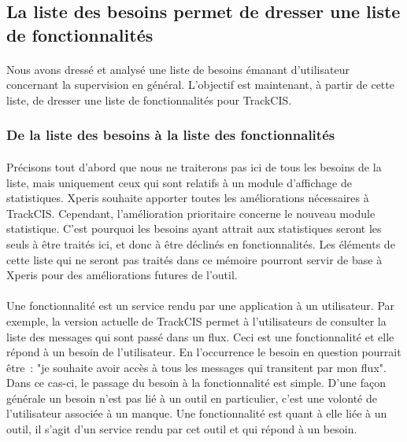 	\subsection{La liste des besoins permet de dresser une liste de fonctionnalités}
		\paragraph{}%
		Nous avons dressé et analysé une liste de besoins émanant d'utilisateur
		concernant la supervision en général. L'objectif est maintenant, à partir de
		cette liste, de dresser une liste de fonctionnalités pour TrackCIS.
		
		\subsubsection{De la liste des besoins à la liste des fonctionnalités}
			\paragraph{}%
			Précisons tout d'abord que nous ne traiterons pas ici de tous les besoins de la
			liste, mais uniquement ceux qui sont relatifs à un module d'affichage de
			statistiques. Xperis souhaite apporter toutes les améliorations nécessaires à
			TrackCIS. Cependant, l'amélioration prioritaire concerne le nouveau module
			statistique. C'est pourquoi les besoins ayant attrait aux statistiques seront
			les seuls à être traités ici, et donc à être déclinés en
			fonctionnalités.\newline
			Les éléments de cette liste qui ne seront pas traités dans ce mémoire
			pourront servir de base à Xperis pour des améliorations futures de l'outil.
		
			\paragraph{}%
			Une fonctionnalité est un service rendu par une application à un utilisateur.
			Par exemple, la version actuelle de TrackCIS permet à l'utilisateurs de
			consulter la liste des messages qui sont passé dans un flux. Ceci est une
			fonctionnalité et elle répond à un besoin de l'utilisateur. En l'occurrence
			le besoin en question pourrait être~: "je souhaite avoir accès à tous les messages
			qui transitent par mon flux".
			Dans ce cas-ci, le passage du besoin à la fonctionnalité est simple. D’une
			façon générale un besoin n'est pas lié à un outil en particulier, c'est une
			volonté de l'utilisateur associée à un manque.
			Une fonctionnalité est quant à elle liée à un outil, il
			s'agit d'un service rendu par cet outil et qui répond à un besoin.
		
